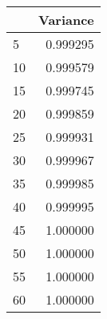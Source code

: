 \begin{tabular}{lr}
\toprule
 & Variance \\
\midrule
5 & 0.999295 \\
10 & 0.999579 \\
15 & 0.999745 \\
20 & 0.999859 \\
25 & 0.999931 \\
30 & 0.999967 \\
35 & 0.999985 \\
40 & 0.999995 \\
45 & 1.000000 \\
50 & 1.000000 \\
55 & 1.000000 \\
60 & 1.000000 \\
\bottomrule
\end{tabular}
